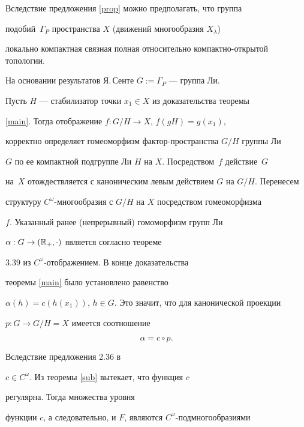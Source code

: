 \begin{pf}


Вследствие предложения \ref{prop} можно предполагать, что группа


подобий~$\Gamma_{P}$ пространства $X$ (движений многообразия $X_{\lambda}$)


локально компактная связная полная относительно компактно-открытой топологии.


На основании результатов Я.\,Сенте \cite{Sz} $G:=\Gamma_{P}$ --- группа Ли.


Пусть $H$ --- стабилизатор точки $x_{1}\in X$ из доказательства теоремы


\ref{main}. Тогда отображение $f: G/H\rightarrow X$, $f(gH)=g(x_{1})$,


корректно определяет гомеоморфизм фактор-пространства $G/H$ группы Ли


$G$ по ее компактной подгруппе Ли $H$ на $X$. Посредством~$f$ действие~$G$ 


на~$X$ отождествляется с каноническим левым действием $G$ на $G/H$. Перенесем


структуру $C^{\omega}$-многообразия с $G/H$ на $X$ посредством гомеоморфизма


$f$. Указанный ранее (непрерывный) гомоморфизм групп Ли


$\alpha: G \rightarrow (\Bbb{R}_{+},\cdot)$ является согласно теореме


3.39 из \cite{W}\linebreak $C^{\omega}$-отображением. В конце доказательства


теоремы \ref{main} было установлено равенство


$\alpha(h)=c(h(x_{1}))$, $h \in G$. Это значит, что для канонической проекции


$p:G \rightarrow G/H=X$ имеется соотношение


\begin{equation}


\label{alpha}


\alpha= c\circ{p}.


\end{equation}


Вследствие предложения 2.36 в


\cite{A} $c \in C^{\omega}$. Из теоремы \ref{sub} вытекает, что функция $c$


регулярна. Тогда множества уровня


функции $c$, а следовательно, и $F$, являются $C^{\omega}$-подмногообразиями



\end{pf}
